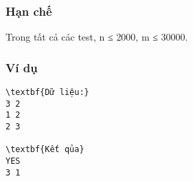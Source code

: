 \subsubsection{   Hạn chế  }

   Trong tất cả các test, n ≤ 2000, m ≤ 30000.  

\subsubsection{   Ví dụ  }
\begin{verbatim}
\textbf{Dữ liệu:}
3 2
1 2
2 3

\textbf{Kết qủa}
YES
3 1
\end{verbatim}
